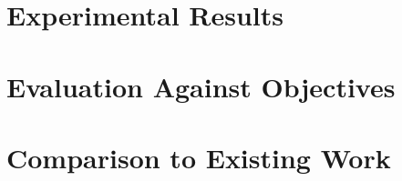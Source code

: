 
\section{Experimental Results}

\section{Evaluation Against Objectives}

\section{Comparison to Existing Work}